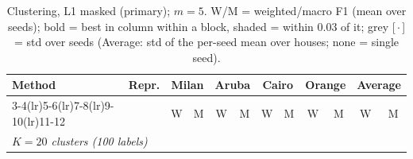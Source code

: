 \begin{table}[H]
\centering\small
\caption{Clustering, L1 masked (primary); $m=5$. W/M = weighted/macro F1 (mean over seeds); bold = best in column within a block, shaded = within 0.03 of it; grey [\,$\cdot$\,] = std over seeds (Average: std of the per-seed mean over houses; none = single seed).}
\label{tab:clu_l1_masked_m5}
\setlength{\tabcolsep}{3.2pt}
\begin{tabular}{llcc|cc|cc|cc|cc}
\toprule
Method & Repr. & \multicolumn{2}{c}{Milan} & \multicolumn{2}{c}{Aruba} & \multicolumn{2}{c}{Cairo} & \multicolumn{2}{c}{Orange} & \multicolumn{2}{c}{Average} \\
\cmidrule(lr){3-4}\cmidrule(lr){5-6}\cmidrule(lr){7-8}\cmidrule(lr){9-10}\cmidrule(lr){11-12}
 & & W & M & W & M & W & M & W & M & W & M \\
\midrule
\multicolumn{12}{l}{\textit{$K = 20$ clusters (100 labels)}} \\
\midrule

\end{tabular}
\end{table}

